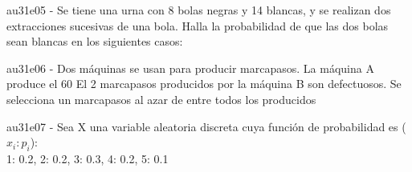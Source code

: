 \documentclass[spanish, 11pt]{exam}
\begin{document}
\begin{questions}
        \begin{multicols}{2}
        \end{multicols}
        \question au31e05 - Se tiene una urna con 8 bolas negras y 14 blancas, y se realizan dos extracciones 
sucesivas de una bola. 
Halla la probabilidad de que las dos bolas sean blancas en los siguientes casos:
        \begin{multicols}{2}
        \end{multicols}
        \question au31e06 - Dos máquinas se usan para producir marcapasos. La máquina A produce el 60%
El 2%
marcapasos producidos por la máquina B son defectuosos. Se selecciona un marcapasos al azar de entre
todos los producidos

        \begin{multicols}{2}
        \end{multicols}
        \question au31e07 - Sea X una variable aleatoria discreta cuya función de probabilidad es ($x_i:p_i$):\\{1: 0.2, 2: 0.2, 3: 0.3, 4: 0.2, 5: 0.1} 
    

\end{questions}
\end{document}
